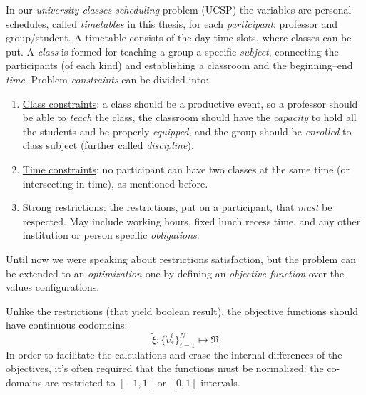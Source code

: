 \documentclass[ThesisDoc]{subfiles}
\begin{document}
  In our \emph{university classes scheduling} problem (UCSP) the variables
are personal schedules, called \emph{timetables} in this thesis,
for each \emph{participant}: professor and group/student.
  A timetable consists of the day-time slots, where classes can be put.
  A \emph{class} is formed for teaching a group a specific \emph{subject},
connecting the participants (of each kind) and establishing a classroom and
the beginning--end \emph{time}.
  Problem \emph{constraints} can be divided into:
\begin{enumerate}
  \item \underline{Class constraints}: a class should be a productive event, so
    a professor should be able to \emph{teach} the class, the classroom should
    have the \emph{capacity} to hold all the students and be properly \emph{equipped},
    and the group should be \emph{enrolled} to class subject
    (further called \emph{discipline}).
  \item \underline{Time constraints}: no participant can have two classes
    at the same time (or intersecting in time), as mentioned before.
  \item \underline{Strong restrictions}: the restrictions, put on a participant, that
    \emph{must} be respected. May include working hours, fixed lunch recess time,
    and any other institution or person specific \emph{obligations}.
\end{enumerate}

\bigskip

  Until now we were speaking about restrictions satisfaction, but the problem can
be extended to an \emph{optimization} one by defining an
\emph{objective function} over the values configurations.

  Unlike the restrictions (that yield boolean result), the objective functions
should have continuous codomains:
$$\tilde\xi : \{{\dot v}^i_\ast\}_{i=1}^N \mapsto \Re$$
  In order to facilitate the calculations and erase the internal differences of
the objectives, it's often required that the functions must be normalized:
the co-domains are restricted to $[-1,1]$ or $[0,1]$ intervals.
\end{document}
